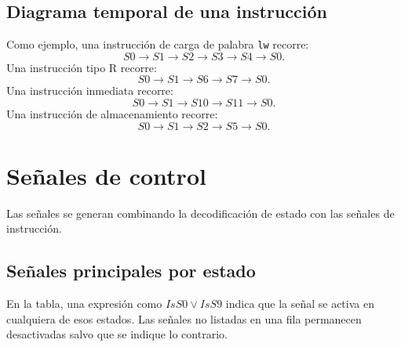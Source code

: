 \documentclass[11pt,a4paper]{article}
\begin{document}
\subsection{Diagrama temporal de una instrucción}

Como ejemplo, una instrucción de carga de palabra \texttt{lw} recorre:
\[
 S0 \rightarrow S1 \rightarrow S2 \rightarrow S3 \rightarrow S4 \rightarrow S0.
\]
Una instrucción tipo R recorre:
\[
 S0 \rightarrow S1 \rightarrow S6 \rightarrow S7 \rightarrow S0.
\]
Una instrucción inmediata recorre:
\[
 S0 \rightarrow S1 \rightarrow S10 \rightarrow S11 \rightarrow S0.
\]
Una instrucción de almacenamiento recorre:
\[
 S0 \rightarrow S1 \rightarrow S2 \rightarrow S5 \rightarrow S0.
\]

\section{Señales de control}

Las señales se generan combinando la decodificación de estado con las señales de instrucción.

\subsection{Señales principales por estado}

En la tabla, una expresión como $IsS0\lor IsS9$ indica que la señal se activa en cualquiera de esos estados. Las señales no listadas en una fila permanecen desactivadas salvo que se indique lo contrario.
\end{document}
